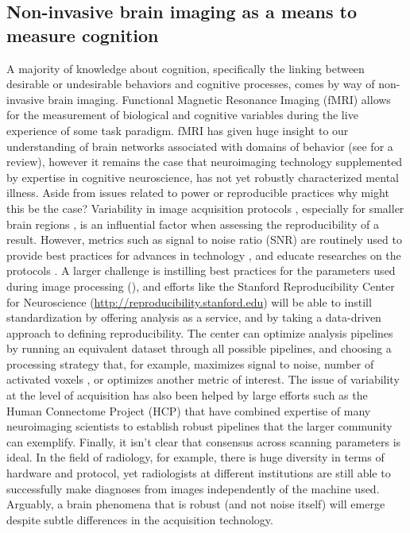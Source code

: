\documentclass{report}
\begin{document}
\subsection{Non-invasive brain imaging as a means to measure cognition}
A majority of knowledge about cognition, specifically the linking between desirable or undesirable behaviors and cognitive processes, comes by way of non-invasive brain imaging. Functional Magnetic Resonance Imaging (fMRI) allows for the measurement of biological and cognitive variables during the live experience of some task paradigm. fMRI has given huge insight to our understanding of brain networks associated with domains of behavior (see \cite{Etkin2013-lo} for a review), however it remains the case that neuroimaging technology supplemented by expertise in cognitive neuroscience, has not yet robustly characterized mental illness. Aside from issues related to power \cite{Button2013-ja} or reproducible practices \cite{Stodden2014-ca,Boettiger2014-cz,noauthor_2014-zc} why might this be the case? Variability in image acquisition protocols \cite{Fera2004-ok}, especially for smaller brain regions \cite{Barry2013-ng}, is an influential factor when assessing the reproducibility of a result. However, metrics such as signal to noise ratio (SNR) are routinely used to provide best practices for advances in technology \cite{Triantafyllou2005-zk}, and educate researches on the protocols \cite{noauthor_undated-nb}. A larger challenge is instilling best practices for the parameters used during image processing (\cite{Norris2006-cs,Turner1998-aj,Secca2008-dn}), and efforts like the Stanford Reproducibility Center for Neuroscience (\href{http://reproducibility.stanford.edu}{http://reproducibility.stanford.edu}) will be able to instill standardization by offering analysis as a service, and by taking a data-driven approach to defining reproducibility. The center can optimize analysis pipelines by running an equivalent dataset through all possible pipelines, and choosing a processing strategy that, for example, maximizes signal to noise, number of activated voxels \cite{Yang1999}, or optimizes another metric of interest. The issue of variability at the level of acquisition has also been helped by large efforts such as the Human Connectome Project (HCP) \cite{Van_Essen2012-wp,Van_Essen2013-fi} that have combined expertise of many neuroimaging scientists to establish robust pipelines that the larger community can exemplify. Finally, it isn't clear that consensus across scanning parameters is ideal. In the field of radiology, for example, there is huge diversity in terms of hardware and protocol, yet radiologists at different institutions are still able to successfully make diagnoses from images independently of the machine used. Arguably, a brain phenomena that is robust (and not noise itself) will emerge despite subtle differences in the acquisition technology.
\end{document}

